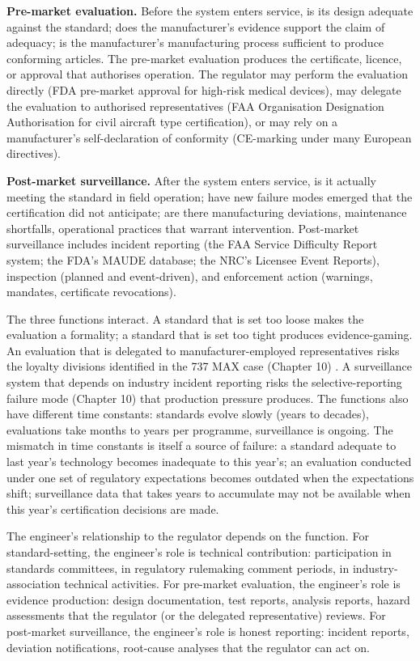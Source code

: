 \textbf{Pre-market evaluation.} Before the system enters service, is its design adequate against the standard; does the manufacturer's evidence support the claim of adequacy; is the manufacturer's manufacturing process sufficient to produce conforming articles. The pre-market evaluation produces the certificate, licence, or approval that authorises operation. The regulator may perform the evaluation directly (FDA pre-market approval for high-risk medical devices), may delegate the evaluation to authorised representatives (FAA Organisation Designation Authorisation for civil aircraft type certification), or may rely on a manufacturer's self-declaration of conformity (CE-marking under many European directives).

\textbf{Post-market surveillance.} After the system enters service, is it actually meeting the standard in field operation; have new failure modes emerged that the certification did not anticipate; are there manufacturing deviations, maintenance shortfalls, operational practices that warrant intervention. Post-market surveillance includes incident reporting (the FAA Service Difficulty Report system; the FDA's MAUDE database; the NRC's Licensee Event Reports), inspection (planned and event-driven), and enforcement action (warnings, mandates, certificate revocations).

The three functions interact. A standard that is set too loose makes the evaluation a formality; a standard that is set too tight produces evidence-gaming. An evaluation that is delegated to manufacturer-employed representatives risks the loyalty divisions identified in the 737 MAX case (Chapter 10) \cite{acc:house-737max-2020}. A surveillance system that depends on industry incident reporting risks the selective-reporting failure mode (Chapter 10) that production pressure produces. The functions also have different time constants: standards evolve slowly (years to decades), evaluations take months to years per programme, surveillance is ongoing. The mismatch in time constants is itself a source of failure: a standard adequate to last year's technology becomes inadequate to this year's; an evaluation conducted under one set of regulatory expectations becomes outdated when the expectations shift; surveillance data that takes years to accumulate may not be available when this year's certification decisions are made.

The engineer's relationship to the regulator depends on the function. For standard-setting, the engineer's role is technical contribution: participation in standards committees, in regulatory rulemaking comment periods, in industry-association technical activities. For pre-market evaluation, the engineer's role is evidence production: design documentation, test reports, analysis reports, hazard assessments that the regulator (or the delegated representative) reviews. For post-market surveillance, the engineer's role is honest reporting: incident reports, deviation notifications, root-cause analyses that the regulator can act on.

